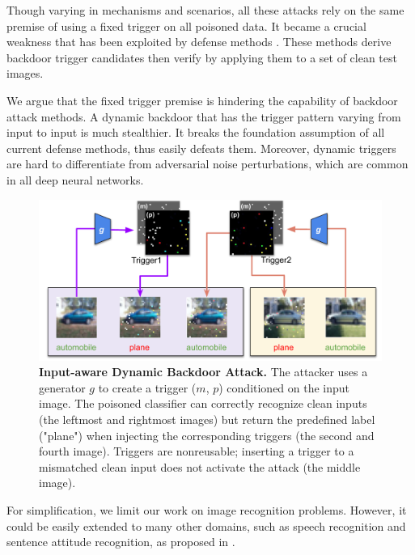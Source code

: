 Though varying in mechanisms and scenarios, all these attacks rely on the same premise of using a fixed trigger on all poisoned data. It became a crucial weakness that has been exploited by defense methods \cite{wang2019neural,liu2019abs,gao2019strip,udeshi2019model}. These methods derive backdoor trigger candidates then verify by applying them to a set of clean test images.

We argue that the fixed trigger premise is hindering the capability of backdoor attack methods. A dynamic backdoor that has the trigger pattern varying from input to input is much stealthier. It breaks the foundation assumption of all current defense methods, thus easily defeats them. Moreover, dynamic triggers are hard to differentiate from adversarial noise perturbations, which are common in all deep neural networks.
\begin{center}
    \begin{figure}[t]
    \begin{center}
     \includegraphics[scale=0.54]{figures/Teaser-crop.pdf}
    \end{center}
    \caption{\textbf{Input-aware Dynamic Backdoor Attack.} The attacker uses a generator $g$ to create a trigger ($m$, $p$) conditioned on the input image. The poisoned classifier can correctly recognize clean inputs (the leftmost and rightmost images) but return the predefined label ("plane") when injecting the corresponding triggers (the second and fourth image). Triggers are nonreusable; inserting a trigger to a mismatched clean input does not activate the attack (the middle image).}
    \label{fig:teaser}
    \end{figure}
    \vspace{-2mm}
\end{center}

For simplification, we limit our work on image recognition problems. However, it could be easily extended to many other domains, such as speech recognition and sentence attitude recognition, as proposed in \cite{liu2017trojaning}.

